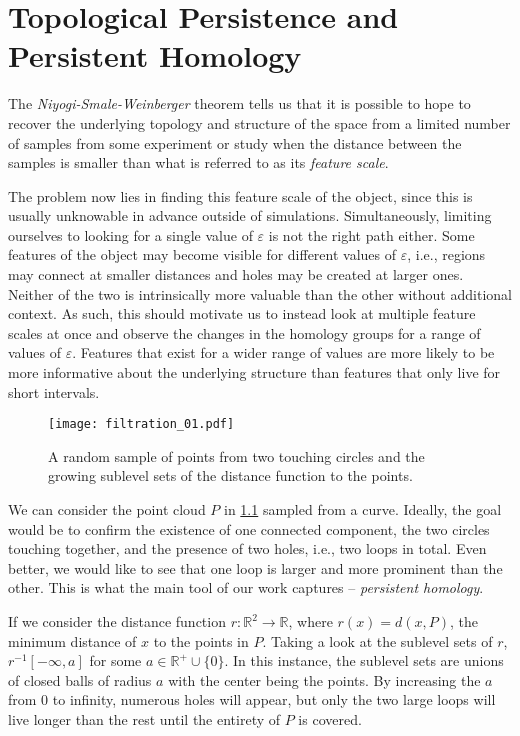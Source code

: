 \chapter{Topological Persistence and Persistent Homology}
\graphicspath{ {/home/tomasp/Dokumenty/Master_Thesis/figures/} }

The \textit{Niyogi-Smale-Weinberger} theorem tells us that it is possible to hope to recover the underlying topology and structure of the space from a limited number of samples from some experiment or study when the distance between the samples is smaller than what is referred to as its \textit{feature scale}.

The problem now lies in finding this feature scale of the object, since this is usually unknowable in advance outside of simulations. Simultaneously, limiting ourselves to looking for a single value of $\varepsilon$ is not the right path either. Some features of the object may become visible for different values of $\varepsilon$, i.e., regions may connect at smaller distances and holes may be created at larger ones. Neither of the two is intrinsically more valuable than the other without additional context. As such, this should motivate us to instead look at multiple feature scales at once and observe the changes in the homology groups for a range of values of $\varepsilon$. Features that exist for a wider range of values are more likely to be more informative about the underlying structure than features that only live for short intervals.

\begin{figure}[h!]
  \centering
  \texttt{[image: filtration\_01.pdf]}
  \caption{A random sample of points from two touching circles and the growing sublevel sets of the distance function to the points.}
  \label{fig:filtration_01}
\end{figure}

We can consider the point cloud $P$ in \ref{fig:filtration_01} sampled from a curve. Ideally, the goal would be to confirm the existence of one connected component, the two circles touching together, and the presence of two holes, i.e., two loops in total. Even better, we would like to see that one loop is larger and more prominent than the other. This is what the main tool of our work captures -- \textit{persistent homology}.

If we consider the distance function $r: \mathbb{R}^{2} \to \mathbb{R}$, where $r(x) = d(x, P)$, the minimum distance of $x$ to the points in $P$. Taking a look at the sublevel sets of $r$, $r^{-1}[-\infty, a]$ for some $a \in \mathbb{R}^{+} \cup \{0\}$. In this instance, the sublevel sets are unions of closed balls of radius $a$ with the center being the points. By increasing the $a$ from $0$ to infinity, numerous holes will appear, but only the two large loops will live longer than the rest until the entirety of $P$ is covered.


